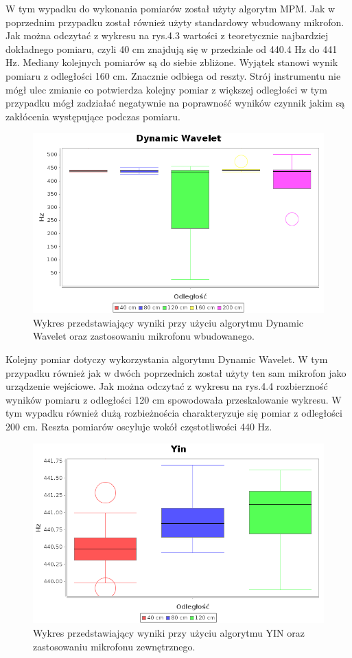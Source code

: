 W tym wypadku do wykonania pomiarów został użyty algorytm MPM. Jak w poprzednim przypadku został również użyty standardowy wbudowany mikrofon. Jak można odczytać z wykresu na rys.4.3  wartości z teoretycznie najbardziej dokładnego pomiaru, czyli 40 cm znajdują się w przedziale od 440.4 Hz do 441 Hz. Mediany kolejnych pomiarów są do siebie zbliżone. Wyjątek stanowi wynik pomiaru z odległości 160 cm. Znacznie odbiega od reszty. Strój instrumentu nie mógł ulec zmianie co potwierdza kolejny pomiar z większej odległości  w tym przypadku mógł zadziałać negatywnie na poprawność wyników czynnik jakim są zakłócenia występujące podczas pomiaru.


\begin{figure}[h!]
  \centering
  \includegraphics[width=0.5\linewidth]{rys/BoxPlots/Dynamic_mic_wb}
  \caption{Wykres przedstawiający wyniki przy użyciu algorytmu Dynamic Wavelet oraz zastosowaniu mikrofonu wbudowanego.}
  \label{fig:schemat}
\end{figure}

\newpage
Kolejny pomiar dotyczy wykorzystania algorytmu Dynamic Wavelet. W tym przypadku również jak w dwóch poprzednich został użyty ten sam mikrofon jako urządzenie wejściowe. Jak można odczytać z wykresu na rys.4.4 rozbierzność wyników pomiaru z odległości 120 cm spowodowała przeskalowanie wykresu. W tym wypadku również dużą rozbieżnościa charakteryzuje się pomiar z odległości 200 cm. Reszta pomiarów oscyluje wokół częstotliwości 440 Hz.


\begin{figure}[h!]
  \centering
  \includegraphics[width=0.5\linewidth]{rys/BoxPlots/YIN_mic_zew}
  \caption{Wykres przedstawiający wyniki przy użyciu algorytmu YIN oraz zastosowaniu mikrofonu zewnętrznego.}
  \label{fig:schemat}
\end{figure}


